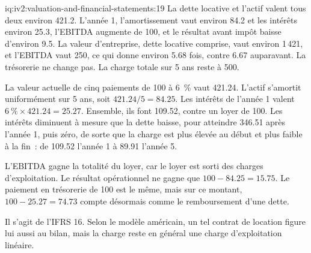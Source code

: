 \begin{solution}{iq:iv2:valuation-and-financial-statements:19}
La dette locative et l'actif valent tous deux environ 421.2. L'année 1, l'amortissement vaut environ 84.2 et les intérêts environ 25.3, l'EBITDA augmente de 100, et le résultat avant impôt baisse d'environ 9.5. La valeur d'entreprise, dette locative comprise, vaut environ 1\,421, et l'EBITDA vaut 250, ce qui donne environ 5.68 fois, contre 6.67 auparavant. La trésorerie ne change pas. La charge totale sur 5 ans reste à 500.

La valeur actuelle de cinq paiements de 100 à 6~\% vaut 421.24. L'actif s'amortit uniformément sur 5 ans, soit $421.24/5 = 84.25$. Les intérêts de l'année 1 valent $6~\% \times 421.24 = 25.27$. Ensemble, ils font 109.52, contre un loyer de 100. Les intérêts diminuent à mesure que la dette baisse, pour atteindre 346.51 après l'année 1, puis zéro, de sorte que la charge est plus élevée au début et plus faible à la fin~: de 109.52 l'année 1 à 89.91 l'année 5.

L'EBITDA gagne la totalité du loyer, car le loyer est sorti des charges d'exploitation. Le résultat opérationnel ne gagne que $100 - 84.25 = 15.75$. Le paiement en trésorerie de 100 est le même, mais sur ce montant, $100 - 25.27 = 74.73$ compte désormais comme le remboursement d'une dette.

Il s'agit de l'IFRS 16. Selon le modèle américain, un tel contrat de location figure lui aussi au bilan, mais la charge reste en général une charge d'exploitation linéaire.

\end{solution}

